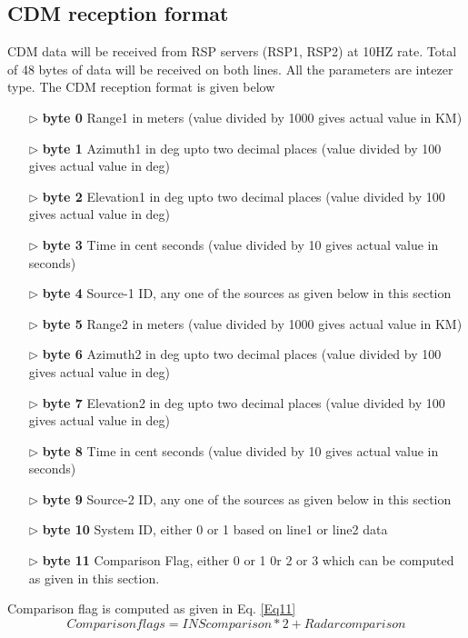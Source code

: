 \subsection{CDM reception format}
\label{CDMRecpFor}
CDM data will be received from RSP servers (RSP1, RSP2) at 10HZ rate. Total of 48 bytes of data will be received on both lines. All the parameters are intezer type. The CDM reception format is given below
\begin{enumerate}
	\item [$\rhd$] \textbf{byte 0} Range1 in meters (value divided by 1000 gives actual value in KM)
	\item [$\rhd$] \textbf{byte 1} Azimuth1 in deg upto two decimal places (value divided by 100 gives actual value in deg)
	\item [$\rhd$] \textbf{byte 2} Elevation1 in deg upto two decimal places (value divided by 100 gives actual value in deg)
	\item [$\rhd$] \textbf{byte 3} Time in cent seconds (value divided by 10 gives actual value in seconds)
	\item [$\rhd$] \textbf{byte 4} Source-1 ID, any one of the sources as given below in this section
	\item [$\rhd$] \textbf{byte 5} Range2 in meters (value divided by 1000 gives actual value in KM)
	\item [$\rhd$] \textbf{byte 6} Azimuth2 in deg upto two decimal places (value divided by 100 gives actual value in deg)
	\item [$\rhd$] \textbf{byte 7} Elevation2 in deg upto two decimal places (value divided by 100 gives actual value in deg)
	\item [$\rhd$] \textbf{byte 8} Time in cent seconds (value divided by 10 gives actual value in seconds)
	\item [$\rhd$] \textbf{byte 9} Source-2 ID, any one of the sources as given below in this section
	\item [$\rhd$] \textbf{byte 10} System ID, either 0 or 1 based on line1 or line2 data
	\item [$\rhd$] \textbf{byte 11} Comparison Flag, either 0 or 1 0r 2 or 3 which can be computed as given  in this section.
\end{enumerate}
	
Comparison flag is computed as given in Eq. \ref{Eq11}
\begin{equation}
Comparison flags =  INS comparison * 2 +  Radar comparison \label{Eq11}
\end{equation}

